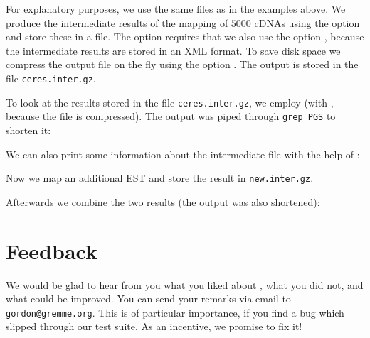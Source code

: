 \documentclass[11pt,a4paper,titlepage]{article}
\begin{document}
For explanatory purposes, we use the same files as in the examples above.
We produce the intermediate results of the mapping of $5000$ cDNAs using the
option  and store these in a file. The option
 requires that we also use the option
, because the intermediate results are stored in an XML
format. To save disk space we compress the output file on the fly using the
option . The output is stored in the file \texttt{ceres.inter.gz}.

\begin{scriptsize}\end{scriptsize}

To look at the results stored in the file \texttt{ceres.inter.gz}, we employ \Callgthconsensus (with , because the file is compressed).
The output was piped through \texttt{grep PGS} to shorten it:


\begin{scriptsize}\end{scriptsize}

We can also print some information about the intermediate file with the help of
\Callgthfilestat:

\begin{footnotesize}\end{footnotesize}

Now we map an additional EST and store the result in \texttt{new.inter.gz}.

\begin{scriptsize}\end{scriptsize}

Afterwards we combine the two results (the output was also shortened):

\begin{scriptsize}\end{scriptsize}


\section{Feedback}
We would be glad to hear from you what you liked about \Gth, what you did not,
and what could be improved. You can send your remarks via email to
\texttt{gordon@gremme.org}. This is of particular importance, if you
find a bug which slipped through our test suite. As an incentive, we promise
to fix it!
\end{document}
